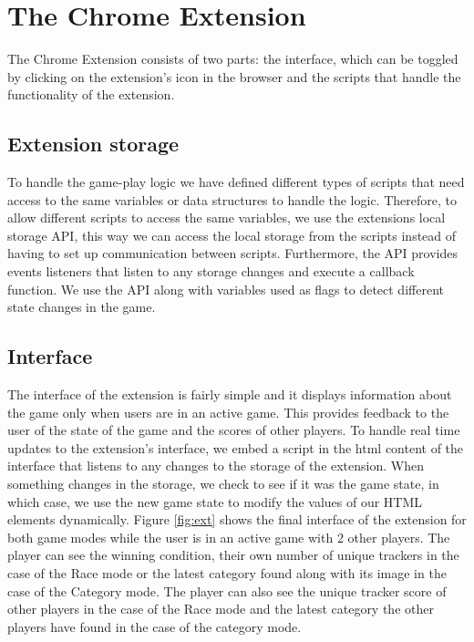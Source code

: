 \documentclass{l4proj}
\begin{document}
\section{The Chrome Extension}
The Chrome Extension consists of two parts: the interface, which can be toggled by clicking on the extension's icon in the browser and the scripts that handle the functionality of the extension.

\subsection{Extension storage}
To handle the game-play logic we have defined different types of scripts that need access to the same variables or data structures to handle the logic. Therefore, to allow different scripts to access the same variables, we use the extensions local storage API, this way we can access the local storage from the scripts instead of having to set up communication between scripts. Furthermore, the API provides events listeners that listen to any storage changes and execute a callback function. We use the API along with variables used as flags to detect different state changes in the game.

\subsection{Interface}
The interface of the extension is fairly simple and it displays information about the game only when users are in an active game. This provides feedback to the user of the state of the game and the scores of other players. To handle real time updates to the extension's interface, we embed a script in the html content of the interface that listens to any changes to the storage of the extension. When something changes in the storage, we check to see if it was the game state, in which case, we use the new game state to modify the values of our HTML elements dynamically. Figure \ref{fig:ext} shows the final interface of the extension for both game modes while the user is in an active game with 2 other players. The player can see the winning condition, their own number of unique trackers in the case of the Race mode or the latest category found along with its image in the case of the Category mode. The player can also see the unique tracker score of other players in the case of the Race mode and the latest category the other players have found in the case of the category mode.
\end{document}
